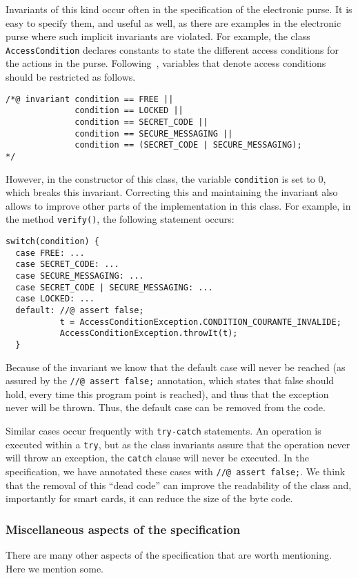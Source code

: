 \documentclass[a4paper]{llncs}
\begin{document}
Invariants of this kind occur often in the specification of the
electronic purse. It is easy to specify them, and useful as well, as
there are examples in the electronic purse where such implicit
invariants are violated.
For example, the class \texttt{AccessCondition} declares constants to
state the different access conditions for the actions in the
purse. Following~\cite{BretagneMGL00}, variables that denote access conditions
should be restricted as follows.
\begin{verbatim}
/*@ invariant condition == FREE ||
              condition == LOCKED ||
              condition == SECRET_CODE ||
              condition == SECURE_MESSAGING ||
              condition == (SECRET_CODE | SECURE_MESSAGING);
*/
\end{verbatim}

However, in the constructor of this class, the variable
\texttt{condition} is set to 0, which breaks this
invariant. Correcting this and maintaining the invariant also allows
to improve other parts of the implementation in this class. For
example, in the method \texttt{verify()}, the following statement
occurs:
\begin{verbatim}
switch(condition) {
  case FREE: ...
  case SECRET_CODE: ...
  case SECURE_MESSAGING: ...
  case SECRET_CODE | SECURE_MESSAGING: ...
  case LOCKED: ...
  default: //@ assert false;
           t = AccessConditionException.CONDITION_COURANTE_INVALIDE;
           AccessConditionException.throwIt(t);
  }
\end{verbatim}
Because of the invariant we know that the default case will never
be reached (as assured by the \texttt{//@ assert false;} annotation,
which states that false should hold, every time this program point is
reached), and thus that the exception never will be thrown. Thus, the
default case can be removed from the code.

Similar cases occur frequently with \texttt{try-catch} statements. An
operation is executed within a \texttt{try}, but as the class invariants
assure that the operation never will throw an exception, the
\texttt{catch} clause will never be executed. In the specification, we 
have annotated these cases with \texttt{//@ assert false;}. We think
that the removal of this ``dead code'' can improve the readability of
the class and, importantly for smart cards, it can reduce the 
size of the byte code.


\subsubsection{Miscellaneous aspects of the specification}
There are many other aspects of the specification that are worth
mentioning. Here we mention some.
\end{document}
